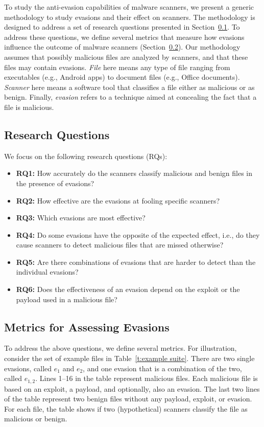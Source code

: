 To study the anti-evasion capabilities of malware scanners, we present a generic methodology to study evasions and their effect on scanners.
The methodology is designed to address a set of research questions presented in Section~\ref{ss: questions}.
To address these questions, we define several metrics that measure how evasions influence the outcome of malware scanners (Section~\ref{ss: metrics}).
Our methodology assumes that possibly malicious files are analyzed by scanners, and that these files may contain evasions.
\emph{File} here means any type of file ranging from executables (e.g., Android apps) to document files (e.g., Office documents).
\emph{Scanner} here means a software tool that classifies a file either as malicious or as benign.
Finally, \emph{evasion} refers to a technique aimed at concealing the fact that a file is malicious.

\subsection{Research Questions}
\label{ss: questions}

We focus on the following research questions (RQs):

\begin{itemize}
    \item \textbf{RQ1:} How accurately do the scanners classify malicious and benign files in the presence of evasions?
    \item \textbf{RQ2:} How effective are the evasions at fooling specific scanners?
    \item \textbf{RQ3:} Which evasions are most effective?
    \item \textbf{RQ4:} Do some evasions have the opposite of the expected effect, i.e.,
      do they cause scanners to detect  malicious files that are missed otherwise?
    \item \textbf{RQ5:} Are there combinations of evasions that are harder to detect than the individual evasions?
    \item \textbf{RQ6:} Does the effectiveness of an evasion depend on the exploit or the payload used in a malicious file?
\end{itemize}

\subsection{Metrics for Assessing Evasions}
\label{ss: metrics}

To address the above questions, we define several metrics.
For illustration, consider the set of example files in Table~\ref{t:example suite}.
There are two single evasions, called $e_1$ and $e_2$, and one evasion that is a combination of the two, called $e_{1,2}$.
Lines 1--16 in the table represent malicious files.
Each malicious file is based on an exploit, a payload, and optionally, also an evasion.
The last two lines of the table represent two benign files without any payload, exploit, or evasion.
For each file, the table shows if two (hypothetical) scanners classify the file as malicious or benign.

